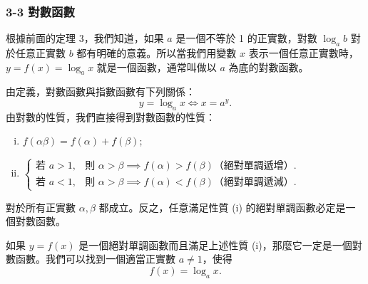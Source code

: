 \subsubsection*{3-3 對數函數}

根據前面的定理 3，我們知道，如果 $a$ 是一個不等於 1 的正實數，對數 $\log_a b$ 對於任意正實數 $b$ 都有明確的意義。所以當我們用變數 $x$ 表示一個任意正實數時，$y = f(x) = \log_a x$ 就是一個函數，通常叫做以 $a$ 為底的對數函數。

由定義，對數函數與指數函數有下列關係：
\[
y = \log_a x \iff x = a^y.
\]
由對數的性質，我們直接得到對數函數的性質：
\begin{enumerate}[(i)]
    \item $f(\alpha\beta) = f(\alpha) + f(\beta)$;
    \item $\begin{cases} \text{若 } a > 1, & \text{則 } \alpha > \beta \implies f(\alpha) > f(\beta) \text{（絕對單調遞增）}. \\ \text{若 } a < 1, & \text{則 } \alpha > \beta \implies f(\alpha) < f(\beta) \text{（絕對單調遞減）}. \end{cases}$
\end{enumerate}
對於所有正實數 $\alpha, \beta$ 都成立。反之，任意滿足性質 (i) 的絕對單調函數必定是一個對數函數。

\begin{theorem}
如果 $y = f(x)$ 是一個絕對單調函數而且滿足上述性質 (i)，那麼它一定是一個對數函數。我們可以找到一個適當正實數 $a \neq 1$，使得
\[
f(x) = \log_a x.
\]
\end{theorem}
